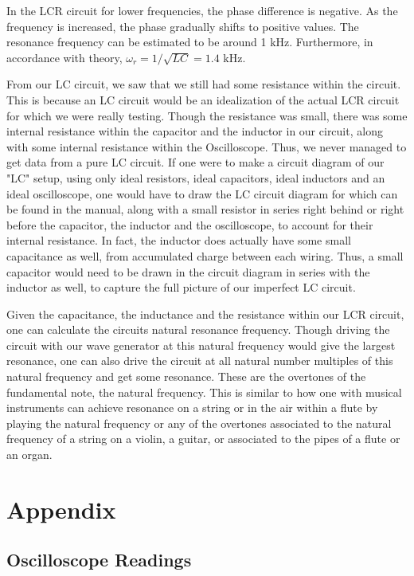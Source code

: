 \documentclass[a4paper,12pt]{article}
\begin{document}
In the LCR circuit for lower frequencies, the phase difference is negative. As the frequency is
increased, the phase gradually shifts to positive values. The resonance frequency can be estimated to be around 1 kHz. 
Furthermore, in accordance with theory, $\omega_r = 1/\sqrt{LC} = 1.4$ kHz.

From our LC circuit, we saw that we still had some resistance within the circuit. This is because an LC circuit would 
be an idealization of the actual LCR circuit for which we were really testing. Though the resistance was small, there was
some internal resistance within the capacitor and the inductor in our circuit, along with some internal resistance within the Oscilloscope.
Thus, we never managed to get data from a pure LC circuit. If one were to make a circuit diagram of our "LC" setup, using only ideal resistors, 
ideal capacitors, ideal inductors and an ideal oscilloscope, one would have to draw the LC circuit diagram for which can be found in the manual,
along with a small resistor in series right behind or right before the capacitor, the inductor and the oscilloscope, to account for their internal resistance.
In fact, the inductor does actually have some small capacitance as well, from accumulated charge between each wiring. Thus, a small capacitor 
would need to be drawn in the circuit diagram in series with the inductor as well, to capture the full picture of our imperfect LC circuit.

Given the capacitance, the inductance and the resistance within our LCR circuit, one can calculate the circuits natural resonance frequency.
Though driving the circuit with our wave generator at this natural frequency would give the largest resonance, one can also drive the circuit at all 
natural number multiples of this natural frequency and get some resonance. These are the overtones of the fundamental note, the natural frequency. 
This is similar to how one with musical instruments can achieve resonance on a string or in the air within a flute by playing the natural frequency or any 
of the overtones associated to the natural frequency of a string on a violin, a guitar, or associated to the pipes of a flute or an organ.


\pagebreak

\appendix

\section{Appendix}

\subsection{Oscilloscope Readings}
\end{document}
